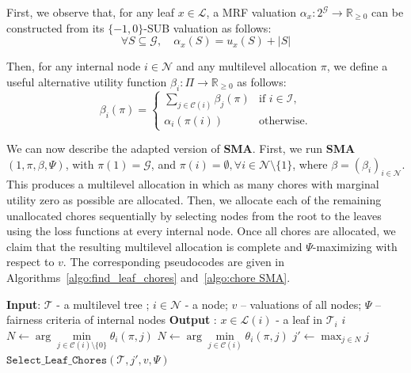\documentclass[]{article}
\newcommand{\tree}{\mathcal{T}}
\newcommand{\nodes}{\mathcal{N}}
\newcommand{\items}{\mathcal{G}}
\newcommand{\children}{\mathcal{C}}
\newcommand{\leaves}{\mathcal{L}}
\newcommand{\internal}{\mathcal{I}}
\begin{document}
First, we observe that, for any leaf $x \in \leaves$, a MRF valuation $\alpha_x: 2^\items \rightarrow \mathbb{R}_{\geq 0}$ can be constructed from its $\{-1,0\}$-SUB valuation as follows: 
$$\forall S \subseteq \items, \quad \alpha_x(S) = u_x(S) + |S|$$

Then, for any internal node $i \in \nodes$ and any multilevel allocation $\pi$, we define a useful alternative utility function $\beta_i: \Pi \rightarrow \mathbb{R}_{\geq 0}$ as follows:  
\[
\beta_i(\pi) =
\begin{cases}
\sum_{j \in \children(i)} \beta_j(\pi) & \text{if } i \in \internal, \\
\alpha_i(\pi(i)) & \text{otherwise}.
\end{cases}
\]

We can now describe the adapted version of \textbf{SMA}. First, we run \textbf{SMA}$(1, \pi, \beta, \Psi)$, with $\pi(1) = \items$, and $\pi(i) = \emptyset, \forall i \in \nodes \setminus \{1\}$, where $\beta = (\beta_i)_{i \in \nodes}$. This produces a multilevel allocation in which as many chores with marginal utility zero as possible are allocated. Then, we allocate each of the remaining unallocated chores sequentially by selecting nodes from the root to the leaves using the loss functions at every internal node. Once all chores are allocated, we claim that the resulting multilevel allocation is complete and $\Psi$-maximizing with respect to $v$. The corresponding pseudocodes are given in Algorithms~\ref{algo:find_leaf_chores} and~\ref{algo:chore SMA}.

\begin{algorithm}[]
\small
\caption{\small Select\_Leaf\_Chores}
\label{algo:find_leaf_chores}
\begin{algorithmic}[1]
    \State \textbf{Input}: $\tree$ - a multilevel tree ; $i \in \nodes$ - a node; $v$ -- valuations of all nodes; $\Psi$ -- fairness criteria of internal nodes
    \State \textbf{Output} : $x \in \leaves(i)$ - a leaf in $\tree_i$
    \If{$\children(i) = \emptyset$} 
    \State \Return $i$ \EndIf
    \State $N \gets \arg \underset{j \in \children(i) \setminus \{0\}}{\min} \theta_i(\pi, j)$
    \Else 
    \State $N \gets \arg \underset{j \in \children(i)}{\min} \theta_i(\pi, j)$ \EndIf
    \State $j' \gets \max_{j \in N} j$
    \State \Return $\mathtt{Select\_Leaf\_Chores}(\tree, j', v, \Psi)$
\end{algorithmic}
\end{algorithm}
\end{document}
